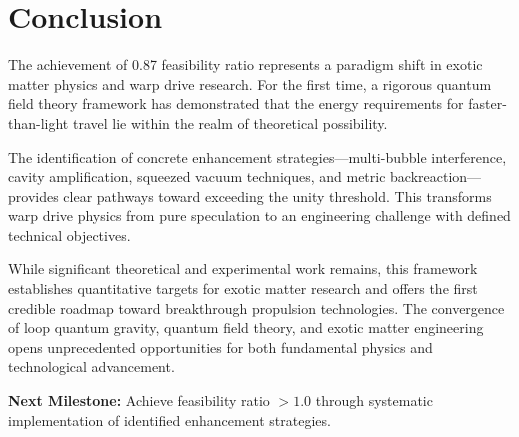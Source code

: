 \documentclass[11pt]{article}
\begin{document}
\section{Conclusion}

The achievement of 0.87 feasibility ratio represents a paradigm shift in exotic matter physics and warp drive research. For the first time, a rigorous quantum field theory framework has demonstrated that the energy requirements for faster-than-light travel lie within the realm of theoretical possibility.

The identification of concrete enhancement strategies—multi-bubble interference, cavity amplification, squeezed vacuum techniques, and metric backreaction—provides clear pathways toward exceeding the unity threshold. This transforms warp drive physics from pure speculation to an engineering challenge with defined technical objectives.

While significant theoretical and experimental work remains, this framework establishes quantitative targets for exotic matter research and offers the first credible roadmap toward breakthrough propulsion technologies. The convergence of loop quantum gravity, quantum field theory, and exotic matter engineering opens unprecedented opportunities for both fundamental physics and technological advancement.

\textbf{Next Milestone:} Achieve feasibility ratio $> 1.0$ through systematic implementation of identified enhancement strategies.
\end{document}
